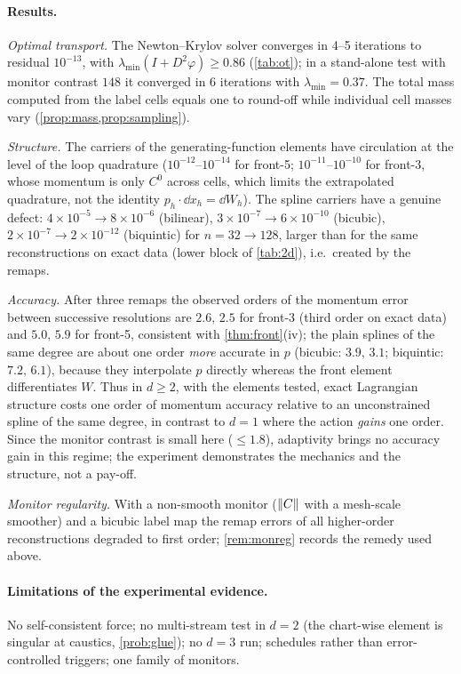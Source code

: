 \paragraph{Results.}
\emph{Optimal transport.} The Newton--Krylov solver converges in 4--5 iterations to residual $10^{-13}$, with
$\lambda_{\min}(I+D^2\varphi)\ge0.86$ (\cref{tab:ot}); in a stand-alone test with monitor contrast $148$ it converged
in 6 iterations with $\lambda_{\min}=0.37$. The total mass computed from the label cells equals one to round-off
while individual cell masses vary (\cref{prop:mass,prop:sampling}).

\emph{Structure.} The carriers of the generating-function elements have circulation at the level of the loop
quadrature ($10^{-12}$--$10^{-14}$ for front-5; $10^{-11}$--$10^{-10}$ for front-3, whose momentum is only $C^0$ across cells,
which limits the extrapolated quadrature, not the identity $p_h\cdot\dd x_h=\dd W_h$). The spline carriers have a
genuine defect: $4\times10^{-5}\to8\times10^{-6}$ (bilinear), $3\times10^{-7}\to6\times10^{-10}$ (bicubic),
$2\times10^{-7}\to2\times10^{-12}$ (biquintic) for $n=32\to128$, larger than for the same reconstructions on exact
data (lower block of \cref{tab:2d}), i.e.\ created by the remaps.

\emph{Accuracy.} After three remaps the observed orders of the momentum error between successive resolutions are
$2.6,\,2.5$ for front-3 (third order on exact data) and $5.0,\,5.9$ for front-5, consistent with
\cref{thm:front}(iv); the plain splines of the same degree are about one order \emph{more} accurate in $p$
(bicubic: $3.9,\,3.1$; biquintic: $7.2,\,6.1$), because they interpolate $p$ directly whereas the front element
differentiates $W$. Thus in $d\ge2$, with the elements tested, exact Lagrangian structure costs one order of
momentum accuracy relative to an unconstrained spline of the same degree, in contrast to $d=1$ where the action
\emph{gains} one order. Since the monitor contrast is small here ($\le1.8$), adaptivity brings no accuracy gain in this
regime; the experiment demonstrates the mechanics and the structure, not a pay-off.

\emph{Monitor regularity.} With a non-smooth monitor ($\lVert C\rVert$ with a mesh-scale smoother) and a bicubic label
map the remap errors of all higher-order reconstructions degraded to first order; \cref{rem:monreg} records the
remedy used above.

\paragraph{Limitations of the experimental evidence.} No self-consistent force; no multi-stream test in $d=2$
(the chart-wise element is singular at caustics, \cref{prob:glue}); no $d=3$ run; schedules rather than
error-controlled triggers; one family of monitors.
